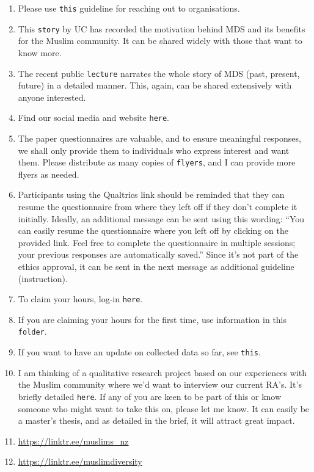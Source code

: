 \documentclass[
]{interact}
\begin{document}
\begin{enumerate}
\item
  Please use \texttt{this} guideline for reaching out to organisations.
\item
  This \texttt{story} by UC has recorded the motivation behind MDS and
  its benefits for the Muslim community. It can be shared widely with
  those that want to know more.
\item
  The recent public \texttt{lecture} narrates the whole story of MDS
  (past, present, future) in a detailed manner. This, again, can be
  shared extensively with anyone interested.
\item
  Find our social media and website \texttt{here}.
\item
  The paper questionnaires are valuable, and to ensure meaningful
  responses, we shall only provide them to individuals who express
  interest and want them. Please distribute as many copies of
  \texttt{flyers}, and I can provide more flyers as needed.
\item
  Participants using the Qualtrics link should be reminded that they can
  resume the questionnaire from where they left off if they don't
  complete it initially. Ideally, an additional message can be sent
  using this wording: ``You can easily resume the questionnaire where
  you left off by clicking on the provided link. Feel free to complete
  the questionnaire in multiple sessions; your previous responses are
  automatically saved.'' Since it's not part of the ethics approval, it
  can be sent in the next message as additional guideline (instruction).
\item
  To claim your hours, log-in \texttt{here}.
\item
  If you are claiming your hours for the first time, use information in
  this \texttt{folder}.
\item
  If you want to have an update on collected data so far, see
  \texttt{this}.
\item
  I am thinking of a qualitative research project based on our
  experiences with the Muslim community where we'd want to interview our
  current RA's. It's briefly detailed \texttt{here}. If any of you are
  keen to be part of this or know someone who might want to take this
  on, please let me know. It can easily be a master's thesis, and as
  detailed in the brief, it will attract great impact.
\item
  \url{https://linktr.ee/muslims_nz}
\item
  \url{https://linktr.ee/muslimdiversity}
\end{enumerate}
\end{document}
